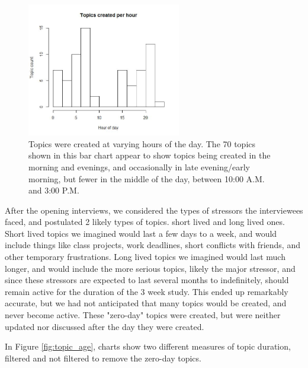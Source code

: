   \begin{figure}
  \centering
  \includegraphics[width=0.6\textwidth]{topics_per_hour.jpg}
  \caption[Topics Created by Hour of Day]{
    Topics were created at varying hours of the day.
    The 70 topics shown in this bar chart appear to show
    topics being created in the morning and evenings,
    and occasionally in late evening/early morning,
    but fewer in the middle of the day, between 10:00 A.M. and 3:00 P.M.
  }
  \label{fig:topic_hours}
  \end{figure}

  After the opening interviews, we considered the types of stressors the
  interviewees faced, and postulated 2 likely types of topics.
  short lived and long lived ones.
  Short lived topics we imagined would last a few days to a week,
  and would include things like class projects,
  work deadlines, short conflicts with friends, and other temporary frustrations.
  Long lived topics we imagined would last much longer,
  and would include the more serious topics, likely the major stressor,
  and since these stressors are expected to last several months to indefinitely,
  should remain active for the duration of the 3 week study.
  This ended up remarkably accurate,
  but we had not anticipated that many topics would be created,
  and never become active.
  These "zero-day" topics were created,
  but were neither updated nor discussed after the day they were created.

  In Figure \ref{fig:topic_age}, charts show two different measures of 
  topic duration, filtered and not filtered to remove the zero-day topics.

